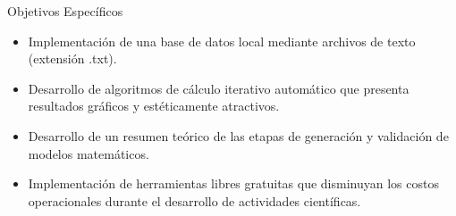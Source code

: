\begin{frame}[t]{Objetivos Específicos}\vspace{10pt}
\begin{itemize}
	\item Implementación de una base de datos local mediante archivos de texto (extensión .txt).
	\item Desarrollo de algoritmos de cálculo iterativo automático que presenta resultados gráficos y estéticamente atractivos.
	\item Desarrollo de un resumen teórico de las etapas de generación y validación de modelos matemáticos.
	\item Implementación de herramientas libres gratuitas que disminuyan los costos operacionales durante el desarrollo de actividades científicas.
\end{itemize}
\end{frame}